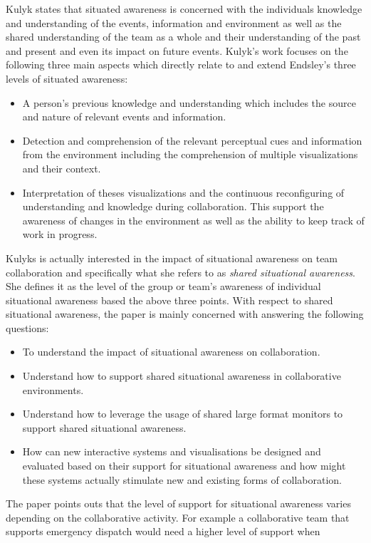 \documentclass{sig-alternate}
\begin{document}
Kulyk states that situated awareness is concerned with the individuals knowledge
and understanding of the events, information and environment as well as the
shared understanding of the team as a whole and their understanding of the past
and present and even its impact on future events. Kulyk's work focuses on the
following three main aspects which directly relate to and extend Endsley's three
levels of situated awareness:
\begin{itemize}
\item A person's previous knowledge and understanding which includes the
source and nature of relevant events and information.
\item Detection and comprehension of the relevant perceptual cues and
information from the environment including the comprehension of multiple
visualizations and their context.
\item Interpretation of theses visualizations and the continuous reconfiguring of
understanding and knowledge during collaboration. This support the
awareness of changes in the environment as well as the ability to
keep track of work in progress.\end{itemize} 
Kulyks is actually interested in the impact of situational awareness on team
collaboration and specifically what she refers to as \emph{shared situational
awareness}. She defines it as the level of the group or team's awareness of
individual situational awareness based the above three points. With respect to
shared situational awareness, the paper is mainly concerned with answering the
following questions:
\begin{itemize}
\item To understand the impact of situational awareness on
collaboration.
\item Understand how to support shared situational awareness in collaborative
environments.
\item Understand how to leverage the usage of shared large format monitors to 
support shared situational awareness.
\item How can new interactive systems and visualisations be designed and
evaluated based on their support for situational awareness and how might these
systems actually stimulate new and existing forms of collaboration.
\end{itemize}
The paper points outs that the level of support for situational awareness
varies depending on the collaborative activity. For example a collaborative team
that supports emergency dispatch would need a higher level of support when
\end{document}
